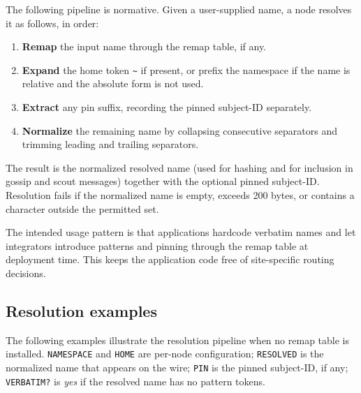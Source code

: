 The following pipeline is normative. Given a user-supplied name, a node resolves it
as follows, in order:

\begin{enumerate}
    \item \textbf{Remap} the input name through the remap table, if any.
    \item \textbf{Expand} the home token \texttt{\textasciitilde} if present, or
    prefix the namespace if the name is relative and the absolute form is not used.
    \item \textbf{Extract} any pin suffix, recording the pinned subject-ID separately.
    \item \textbf{Normalize} the remaining name by collapsing consecutive separators
    and trimming leading and trailing separators.
\end{enumerate}

The result is the normalized resolved name (used for hashing and for inclusion in
gossip and scout messages) together with the optional pinned subject-ID.
Resolution fails if the normalized name is empty, exceeds 200 bytes, or contains a
character outside the permitted set.

\begin{remark}
    The intended usage pattern is that applications hardcode verbatim names and let
    integrators introduce patterns and pinning through the remap table at deployment
    time. This keeps the application code free of site-specific routing decisions.
\end{remark}

\subsection{Resolution examples}

The following examples illustrate the resolution pipeline when no remap table
is installed. \texttt{NAMESPACE} and \texttt{HOME} are per-node configuration;
\texttt{RESOLVED} is the normalized name that appears on the wire;
\texttt{PIN} is the pinned subject-ID, if any;
\texttt{VERBATIM?} is \emph{yes} if the resolved name has no pattern tokens.

